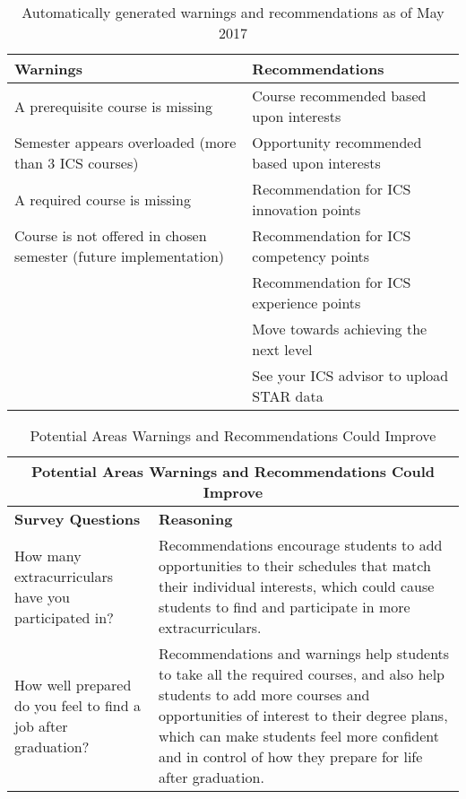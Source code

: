 \begin{table}[htbp!]
\centering
\begin{tabular}{  |p{8cm}|p{8cm}| } 
  \hline
 \textbf{Warnings} & \textbf{Recommendations} \\ 
  \hline
A prerequisite course is missing & Course recommended based upon interests\\
\hline
Semester appears overloaded (more than 3 ICS courses) & Opportunity recommended based upon interests\\
\hline
A required course is missing & Recommendation for ICS innovation points \\
\hline
Course is not offered in chosen semester (future implementation) & Recommendation for ICS competency points \\
\hline
& Recommendation for ICS experience points\\
\hline
& Move towards achieving the next level \\
\hline
& See your ICS advisor to upload STAR data\\
 \hline
\end{tabular}
\caption{Automatically generated warnings and recommendations as of May 2017}
\label{table:warnings-recommendations}
\end{table}

\begin{table}[htbp!]
\centering
\begin{tabular}{  |p{4cm}|p{12cm}| } 
\hline
 \multicolumn{2}{|c|}{Potential Areas Warnings and Recommendations Could Improve}\\
\hline
 \textbf{Survey Questions} & \textbf{Reasoning} \\ 
  \hline
  How many extracurriculars have you participated in? & Recommendations encourage students to add opportunities to their schedules that match their individual interests, which could cause students to find and participate in more extracurriculars.\\
  \hline
  How well prepared do you feel to find a job after graduation? & Recommendations and warnings help students to take all the required courses, and also help students to add more courses and opportunities of interest to their degree plans, which can make students feel more confident and in control of how they prepare for life after graduation. \\
  \hline
\end{tabular}
 \caption{Potential Areas Warnings and Recommendations Could Improve}
\end{table}

